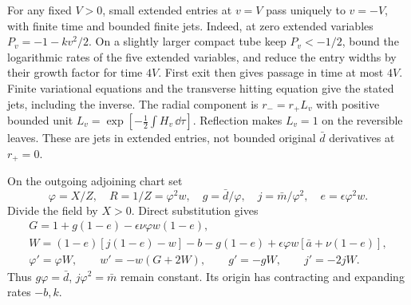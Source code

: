 For any fixed $V>0$, small extended entries at $v=V$ pass uniquely
to $v=-V$, with finite time and bounded finite jets. Indeed, at zero
extended variables $P_v=-1-kv^2/2$. On a slightly larger compact tube keep
$P_v<-1/2$, bound the logarithmic rates of the five extended variables,
and reduce the entry widths by their growth factor for time $4V$.
First exit then gives passage in time at most $4V$.
Finite variational equations and the transverse hitting equation give
the stated jets, including the inverse. The radial component is
$r_-=r_+L_v$ with positive bounded unit
$L_v=\exp[-\frac12\int H_v\,\dd\tau]$.
Reflection makes $L_v=1$ on the reversible leaves.
These are jets in extended entries, not bounded original
$\bar d$ derivatives at $r_+=0$.

On the outgoing adjoining chart set
\[
 \varphi=X/Z,\quad R=1/Z=\varphi^2w,\quad
 g=\bar d/\varphi,\quad j=\bar m/\varphi^2,\quad
 e=\epsilon\varphi^2w .
\]
Divide the field by $X>0$. Direct substitution gives
\begin{equation}\label{rw:secondary:adjoining}
\begin{gathered}
 G=1+g(1-e)-\epsilon\nu\varphi w(1-e),\\
 W=(1-e)[j(1-e)-w]-b-g(1-e)
                     +\epsilon\varphi w[\bar a+\nu(1-e)],\\
 \varphi'=\varphi W,\qquad w'=-w(G+2W),\qquad
 g'=-gW,\qquad j'=-2jW.
\end{gathered}
\end{equation}
Thus $g\varphi=\bar d$, $j\varphi^2=\bar m$ remain constant.
Its origin has contracting and expanding rates $-b,k$.

